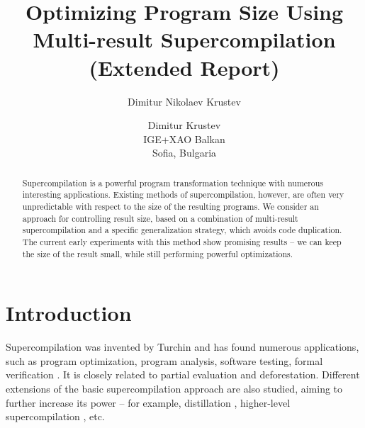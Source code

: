 \documentclass[submission,copyright,creativecommons]{eptcs}
\title{Optimizing Program Size Using Multi-result Supercompilation \ifVptVer\else \\(Extended Report) \fi}
\author{Dimitur Nikolaev Krustev
\institute{IGE+XAO Balkan\\ Sofia, Bulgaria}
\email{\quad \EmailAddress{dkrustev}{ige-xao.com}}
}
\author{Dimitur Krustev\\IGE+XAO Balkan\\ Sofia, Bulgaria \\ \EmailAddress{dkrustev}{ige-xao.com}}
\begin{document}
\maketitle

\begin{abstract}
Supercompilation is a powerful program transformation technique with numerous interesting applications.
Existing methods of supercompilation, however, are often very unpredictable with respect to the size
of the resulting programs.
We consider an approach for controlling result size, based on a combination of multi-result
supercompilation and a specific generalization strategy, which avoids code duplication.
The current early experiments with this method show promising results -- we can keep
the size of the result small, while still performing powerful optimizations.
\end{abstract}

\section{Introduction}

Supercompilation was invented by Turchin \cite{TurchinSupercompilerConcept} and has found numerous
applications, such as program optimization\cite{Sorensen1994TurchinSupercompiler,sorm98b,TMR/SCP2014}, 
program analysis, software testing, formal verification \cite{Klyuchnikov2010,Lisitsa2017,MendelGleasonPhD2011}.
It is closely related to partial evaluation \cite{Jones:1993:PEA:153676} and deforestation.
Different extensions of the basic supercompilation approach are also studied, aiming to further increase
its power -- for example, distillation \cite{10.1145/1244381.1244391}, higher-level supercompilation \cite{Klyuchnikov:META2010:HigherLevelScp}, etc.
\end{document}
